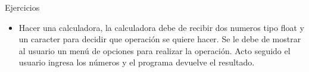 \begin{frame}{Ejercicios}

\begin{itemize}
\itemsep1pt\parskip0pt
\item
  Hacer una calculadora, la calculadora debe de recibir dos numeros tipo
  float y un caracter para decidir que operación se quiere hacer. Se le
  debe de mostrar al usuario un menú de opciones para realizar la
  operación. Acto seguido el usuario ingresa los números y el programa
  devuelve el resultado.
\end{itemize}

\end{frame}
